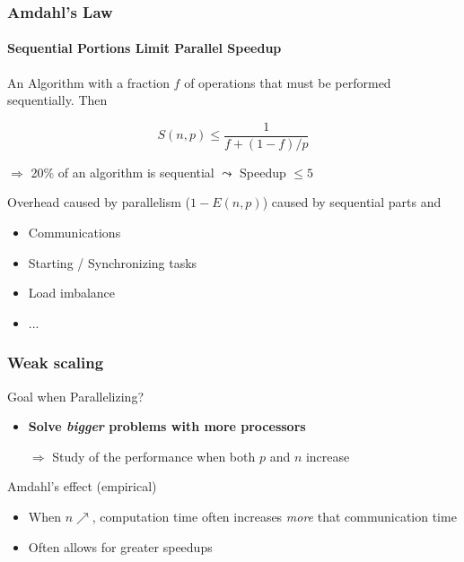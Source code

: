 \documentclass[xcolor={x11names,svgnames,psnames}]{beamer}
\begin{document}

\begin{frame}
  \frametitle{Amdahl's Law}
  \framesubtitle{Sequential Portions Limit Parallel Speedup}

  An Algorithm with a fraction $f$ of operations that must be performed
  sequentially. Then

\[
  S(n,p)  \leq  \frac{1}{f + (1 - f)/p}
\]

$\Rightarrow$ 20\% of an algorithm is sequential $\leadsto$ Speedup $\leq 5$

\bigskip

Overhead caused by parallelism ($1 - E(n,p)$) 
caused by sequential parts and
\begin{itemize}
\item Communications
\item Starting / Synchronizing tasks 
\item Load imbalance
\item ...
\end{itemize}

\end{frame}

\begin{frame}
\frametitle{Weak scaling}

\begin{alertblock}{Goal when Parallelizing?}
  \begin{itemize}
  \item \textbf{Solve \emph{bigger} problems with more processors}
  \item[$\Rightarrow$] Study of the performance when both $p$ and $n$ increase
  \end{itemize}
\end{alertblock}

\medskip

\begin{exampleblock}{Amdahl's effect (empirical)}
\begin{itemize}
\item When $n \nearrow$, computation time often increases \emph{more} that communication time
\item Often allows for greater speedups
\end{itemize}
\end{exampleblock}
\end{frame}

\end{document}
